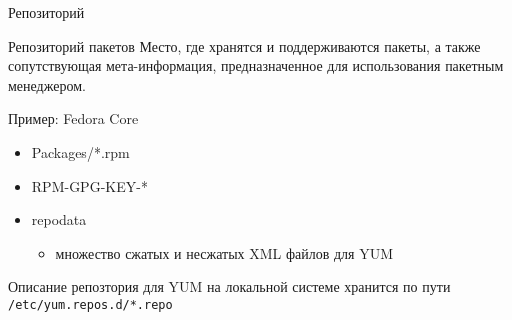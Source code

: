 
\begin{frame}{Репозиторий}
	\begin{block}{Репозиторий пакетов}
		Место, где хранятся и поддерживаются пакеты, а также сопутствующая мета-информация, предназначенное для использования пакетным менеджером.
	\end{block}
	\begin{block}{Пример: Fedora Core}
		\begin{itemize}
			\item Packages/*.rpm
			\item RPM-GPG-KEY-*
			\item repodata
			\begin{itemize}
				\item множество сжатых и несжатых XML файлов для YUM
			\end{itemize}
		\end{itemize}

		Описание репозтория для YUM на локальной системе хранится по пути
		{\tt /etc/yum.repos.d/*.repo}
	\end{block}
		
\end{frame}



